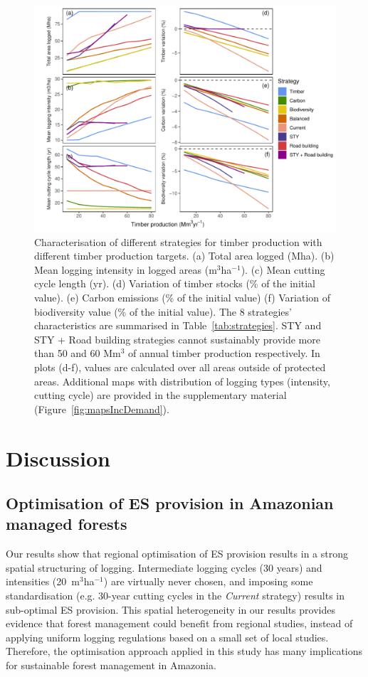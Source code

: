 \documentclass{article}
\begin{document}
\begin{figure}
    \centering
    \includegraphics[width=\linewidth]{graphs/increasingDemand.pdf}
    \caption{ Characterisation of different strategies for timber production with different timber production targets. (a) Total area logged (Mha). (b) Mean logging intensity in logged areas (m$^3$ha$^{-1}$). (c) Mean cutting cycle length (yr). (d) Variation of timber stocks (\% of the initial value). (e) Carbon emissions (\% of the initial value) (f) Variation of biodiversity value (\% of the initial value). The 8 strategies' characteristics are summarised in Table~\ref{tab:strategies}. STY and STY + Road building strategies cannot sustainably provide more than 50 and 60 Mm$^3$ of annual timber production respectively. In plots (d-f), values are calculated over all areas outside of protected areas. Additional maps with distribution of logging types (intensity, cutting cycle) are provided in the supplementary material (Figure~\ref{fig:mapsIncDemand}).
}
    \label{fig:incDemand}
\end{figure}

\section{Discussion}

\subsection{Optimisation of ES provision in Amazonian managed forests}

Our results show that regional optimisation of ES provision results in a strong spatial structuring of logging. Intermediate logging cycles (30 years) and intensities (20~m$^3$ha$^{-1}$) are virtually never chosen, and imposing some standardisation (e.g. 30-year cutting cycles in the \textit{Current} strategy) results in sub-optimal ES provision. This spatial heterogeneity in our results provides evidence that forest management could benefit from regional studies, instead of applying uniform logging regulations based on a small set of local studies. Therefore, the optimisation approach applied in this study has many implications for sustainable forest management in Amazonia. 
\end{document}
